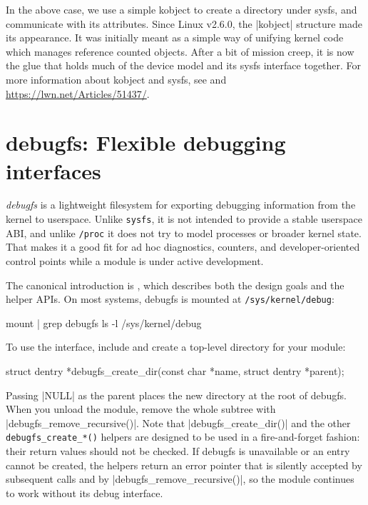 \documentclass[10pt, oneside]{book}
\begin{document}
In the above case, we use a simple kobject to create a directory under sysfs, and communicate with its attributes.
Since Linux v2.6.0, the \cpp|kobject| structure made its appearance.
It was initially meant as a simple way of unifying kernel code which manages reference counted objects.
After a bit of mission creep, it is now the glue that holds much of the device model and its sysfs interface together.
For more information about kobject and sysfs, see  and \url{https://lwn.net/Articles/51437/}.

\section{debugfs: Flexible debugging interfaces}
\label{sec:debugfs}
\emph{debugfs} is a lightweight filesystem for exporting debugging information from the kernel to userspace.
Unlike \verb|sysfs|, it is not intended to provide a stable userspace ABI, and unlike \verb|/proc| it does not try to model processes or broader kernel state.
That makes it a good fit for ad hoc diagnostics, counters, and developer-oriented control points while a module is under active development.

The canonical introduction is , which describes both the design goals and the helper APIs.
On most systems, debugfs is mounted at \verb|/sys/kernel/debug|:

\begin{codebash}
mount | grep debugfs
ls -l /sys/kernel/debug
\end{codebash}

To use the interface, include  and create a top-level directory for your module:

\begin{code}
struct dentry *debugfs_create_dir(const char *name, struct dentry *parent);
\end{code}

Passing \cpp|NULL| as the parent places the new directory at the root of debugfs.
When you unload the module, remove the whole subtree with \cpp|debugfs_remove_recursive()|.
Note that \cpp|debugfs_create_dir()| and the other \verb|debugfs_create_*()| helpers are designed to be used in a fire-and-forget fashion: their return values should not be checked.
If debugfs is unavailable or an entry cannot be created, the helpers return an error pointer that is silently accepted by subsequent calls and by \cpp|debugfs_remove_recursive()|, so the module continues to work without its debug interface.
\end{document}
